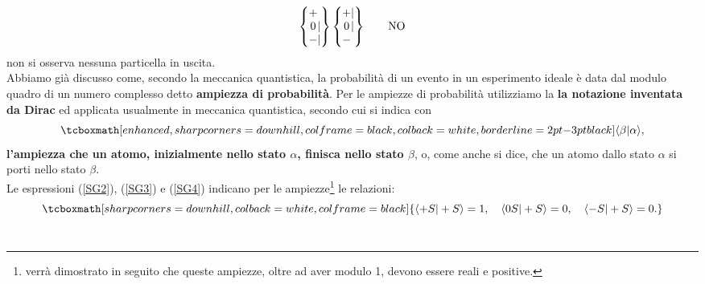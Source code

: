 \documentclass[a4paper,12pt,oneside]{book}
\begin{document}
	\begin{equation}
		\begin{Bmatrix}
 			\makebox[\widthof{$-$}]{$+$}\makebox[\widthof{$|$}]{$\ $} \\ \makebox[\widthof{$-$}]{$0$}|\\ - |  
		\end{Bmatrix}
		\begin{Bmatrix}
 			\makebox[\widthof{$-$}]{$+$} |  \\ \makebox[\widthof{$-$}]{$0$}|  \\ -\makebox[\widthof{$|$}]{$\ $}  
		\end{Bmatrix} \qquad \text{NO}
	\label{SG4}
	\end{equation}
non si osserva nessuna particella in uscita.\\

Abbiamo già discusso come, secondo la meccanica quantistica, la probabilità di un evento in un esperimento ideale è data dal modulo quadro di un numero complesso detto \textbf{ampiezza di probabilità}. Per le ampiezze di probabilità utilizziamo la \textbf{la notazione inventata da Dirac} ed applicata usualmente in meccanica quantistica, secondo cui si indica con 
	\begin{equation}
		\tcboxmath[enhanced, sharp corners=downhill, colframe=black, colback=white, borderline={2pt}{-3pt}{black}]{
			\langle\beta |\alpha \rangle ,
			}
	\end{equation} 
\textbf{l'ampiezza che un atomo, inizialmente nello stato $\alpha$, finisca nello stato $\beta$}, o, come anche si dice, che un atomo dallo stato $\alpha$ si porti nello stato $\beta$.\\

Le espressioni (\ref{SG2}), (\ref{SG3}) e (\ref{SG4}) indicano per le ampiezze\footnote{verrà dimostrato in seguito che queste ampiezze, oltre ad aver modulo 1, devono essere reali e positive.} le relazioni:
	\begin{equation}
		\tcboxmath[sharp corners=downhill, colback=white, colframe=black]{
			\langle +S |+S \rangle =1, \quad \langle 0S | +S \rangle =0, \quad \langle -S | +S \rangle=0 .
			}
	\label{cap3_1}
	\end{equation} \\
\end{document}

